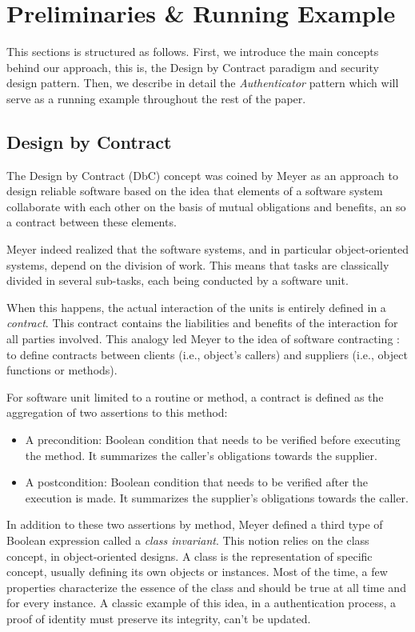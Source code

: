 \section{Preliminaries \& Running Example}
\label{sec:preliminaries}

This sections is structured as follows. First, we introduce the main concepts behind our approach, this is, the Design by Contract paradigm and security design pattern. Then, we describe in detail the \emph{Authenticator} pattern which will serve as a running example throughout the rest of the paper.

\subsection{Design by Contract}

The Design by Contract (DbC) concept was coined by Meyer \cite{meyer1992applying} as an approach to design reliable software based on the idea that elements of a software system collaborate with each other on the basis of mutual obligations and benefits, an so a contract between these elements.

Meyer indeed realized that the software systems, and in particular object-oriented systems, depend on the division of work. This means that tasks are classically divided in several sub-tasks, each being conducted by a software unit.

When this happens, the actual interaction of the units is entirely defined in a \emph{contract}. This contract contains the liabilities and benefits of the interaction for all parties involved. This analogy led Meyer to the idea of software contracting \cite{meyer1992applying}: to define contracts between clients (i.e., object’s callers) and suppliers (i.e., object functions or methods).

For software unit limited to a routine or method, a contract is defined as the aggregation of two assertions to this method:
\begin{itemize}
    \item A precondition:  Boolean condition that needs to be verified before executing the method. It summarizes the caller's obligations towards the supplier.
    \item A postcondition: Boolean condition that needs to be verified after the execution is made. It summarizes the supplier's obligations towards the caller.
\end{itemize}

In addition to these two assertions by method, Meyer defined a third type of Boolean expression called a \textit{class invariant}. This notion relies on the class concept, in object-oriented designs. A class is the representation of specific concept, usually defining its own objects or instances. Most of the time, a few properties characterize the essence of the class and should be true at all time and for every instance. A classic example of this idea, in a authentication process, a proof of identity must preserve its integrity, can't be updated. 

